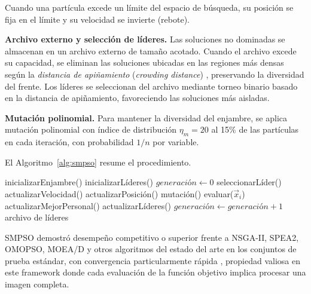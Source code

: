 Cuando una partícula excede un límite del espacio de búsqueda, su posición se fija en el límite y su velocidad se invierte (rebote).

\textbf{Archivo externo y selección de líderes.} Las soluciones no dominadas se almacenan en un archivo externo de tamaño acotado. Cuando el archivo excede su capacidad, se eliminan las soluciones ubicadas en las regiones más densas según la \textit{distancia de apiñamiento} (\textit{crowding distance}) \citep{Deb2002}, preservando la diversidad del frente. Los líderes se seleccionan del archivo mediante torneo binario basado en la distancia de apiñamiento, favoreciendo las soluciones más aisladas.

\textbf{Mutación polinomial.} Para mantener la diversidad del enjambre, se aplica mutación polinomial \citep{Deb2002} con índice de distribución $\eta_m = 20$ al 15\% de las partículas en cada iteración, con probabilidad $1/n$ por variable.

El Algoritmo~\ref{alg:smpso} resume el procedimiento.

\begin{algorithm}[H]
\caption{SMPSO \citep{Nebro2009}}
\label{alg:smpso}
\begin{algorithmic}[1]
\State inicializarEnjambre()
\State inicializarLíderes() 
\State $generación \gets 0$
        \State seleccionarLíder() 
        \State actualizarVelocidad() 
        \State actualizarPosición() 
        \State mutación() 
        \State evaluar($\vec{x}_i$)
        \State actualizarMejorPersonal()
        \State actualizarLíderes()
    \EndFor
    \State $generación \gets generación + 1$
\EndWhile
\State \Return archivo de líderes 
\end{algorithmic}
\end{algorithm}

SMPSO demostró desempeño competitivo o superior frente a NSGA-II, SPEA2, OMOPSO, MOEA/D y otros algoritmos del estado del arte en los conjuntos de prueba estándar, con convergencia particularmente rápida \citep{Nebro2009}, propiedad valiosa en este framework donde cada evaluación de la función objetivo implica procesar una imagen completa.

